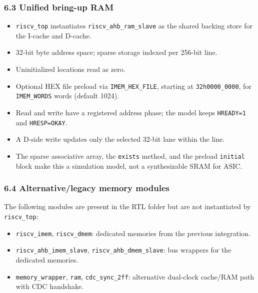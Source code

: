 \documentclass[]{article}
\providecommand{\tightlist}{%
  \setlength{\itemsep}{0pt}\setlength{\parskip}{0pt}}
\begin{document}
\hypertarget{63-unified-bring-up-ram}{%
\subsubsection{6.3 Unified bring-up RAM}\label{63-unified-bring-up-ram}}

\begin{itemize}
\tightlist
\item
  \texttt{riscv\_top} instantiates \texttt{riscv\_ahb\_ram\_slave} as
  the shared backing store for the I-cache and D-cache.
\item
  32-bit byte address space; sparse storage indexed per 256-bit line.
\item
  Uninitialized locations read as zero.
\item
  Optional HEX file preload via \texttt{IMEM\_HEX\_FILE}, starting at
  \texttt{32\textquotesingle{}h0000\_0000}, for \texttt{IMEM\_WORDS}
  words (default 1024).
\item
  Read and write have a registered address phase; the model keeps
  \texttt{HREADY=1} and \texttt{HRESP=OKAY}.
\item
  A D-side write updates only the selected 32-bit lane within the line.
\item
  The sparse associative array, the \texttt{exists} method, and the
  preload \texttt{initial} block make this a simulation model, not a
  synthesizable SRAM for ASIC.
\end{itemize}

\hypertarget{64-alternativelegacy-memory-modules}{%
\subsubsection{6.4 Alternative/legacy memory
modules}\label{64-alternativelegacy-memory-modules}}

The following modules are present in the RTL folder but are not
instantiated by \texttt{riscv\_top}:

\begin{itemize}
\tightlist
\item
  \texttt{riscv\_imem}, \texttt{riscv\_dmem}: dedicated memories from
  the previous integration.
\item
  \texttt{riscv\_ahb\_imem\_slave}, \texttt{riscv\_ahb\_dmem\_slave}:
  bus wrappers for the dedicated memories.
\item
  \texttt{memory\_wrapper}, \texttt{ram}, \texttt{cdc\_sync\_2ff}:
  alternative dual-clock cache/RAM path with CDC handshake.
\end{itemize}
\end{document}
